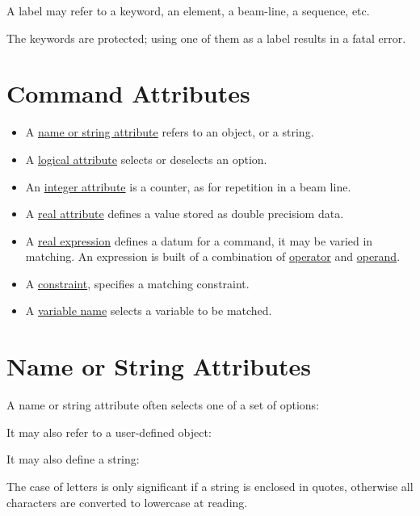 A label may refer to a keyword, an element, a beam-line, a sequence,
etc.   

The \madx keywords are protected; using one of them as a label
results in a fatal error.  


%
\section{Command Attributes}
\label{sec:attribute}

\begin{itemize}
	\item A \href{name.html}{name or string attribute} refers to an object, or a string. 
	\item A \href{logical.html}{logical attribute} selects or deselects an option. 
	\item An \href{integer.html}{integer attribute} is a counter, as for repetition in a beam line. 
        \item A \href{real.html}{real attribute} defines a value stored
          as double precisiom data.  
	\item A \href{expression.html}{real expression} defines a datum
          for a command, it may be varied in matching. An expression is
          built of a combination of
          \href{expression.html#operator}{operator} and
          \href{expression.html#operand}{operand}. 
	\item A \href{constraint.html}{constraint}, specifies a matching constraint. 
	\item A \href{variable.html}{variable name} selects a variable to be matched. 
\end{itemize}


%
\section{Name or String Attributes}
\label{sec:name}\label{sec:string}
A name or string attribute often selects one of a set of options: 

It may also refer to a user-defined object: 

It may also define a string: 

The case of letters is only significant if a string is enclosed in
quotes, otherwise all characters are converted to lowercase at
reading. 

